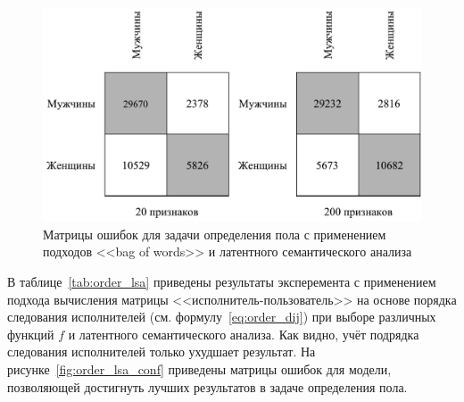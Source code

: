 \begin{figure}[!h]
\caption{Матрицы ошибок для задачи определения пола с
         применением подходов <<bag of words>> и
         латентного семантического анализа}
\label{fig:bow_lsa_conf}
\centering
\includegraphics[scale=0.8]{figs/bow-lsa-confusion.pdf}
\end{figure}

В таблице~\ref{tab:order_lsa} приведены результаты эксперемента
с применением подхода вычисления матрицы <<исполнитель-пользователь>>
на основе порядка следования исполнителей (см. формулу~\ref{eq:order_dij})
при выборе различных функций $f$ и латентного семантического анализа.
Как видно, учёт подрядка следования исполнителей только ухудшает результат.
На рисунке~\ref{fig:order_lsa_conf} приведены матрицы ошибок для 
модели, позволяющей достигнуть лучших результатов в задаче определения
пола.

